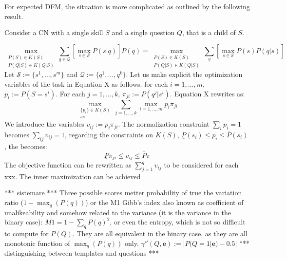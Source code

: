 \documentclass[runningheads]{llncs}
\begin{document}
For expected DFM, the situation is more complicated as outlined by the following result.

\begin{theorem}
Consider a CN with a single skill $S$ and a single question $Q$, that is a child of $S$.

\begin{equation}
\max_{\substack{P(S)\in K(S)\\P(Q|S)\in K(Q|S)}} \sum_{q\in\mathcal{Q}} \left[ \max_{s\in\mathcal{S}} P(s|q) \right] P(q)
=\max_{\substack{P(S)\in K(S)\\P(Q|S)\in K(Q|S)}} \sum_q \left[ \max_{s\in\mathcal{S}} P(s)P(q|s) \right] 
\end{equation}
Let $\mathcal{S}:=\{s^1,\ldots,s^m\}$ and
$\mathcal{Q}:=\{q^1,\ldots,q^k\}$.
Let us make explicit the optimization variables of the task in Equation X as follows. 
for each $i=1,\ldots,m$, $p_i:=P(S=s^i)$.
For each $j=1,\ldots,k$, $\pi_{ji}:=P(q^j|s^i)$. Equation X rewrites as:
\begin{equation}
\max_{\substack{\{p_i\} \in K(S)\\ ss}} \sum_{j=1,\ldots,k} \max_{i=1,\ldots,m} p_i \pi_{ji} 
\end{equation}
We introduce the variables $v_{ij}:=p_i \pi_{ji}$. The normalization constraint $\sum_i p_i=1$ becomes $\sum_{ij} v_{ij}=1$, regarding the constraints on $K(S)$, $\underline{P}(s_i) \leq p_i \leq \overline{P}(s_i)$, the becomes:
$$\underline{P} \pi_{ji} \leq v_{ij} \leq \overline{P} \pi$$
The objective function can be rewritten as $\sum_{j=1}^q v_{ij}$
to be considered for each xxx.
The inner maximization can be achieved 
\end{theorem}

*** sistemare *** Three possible scores metter probability of true the variation ratio ($1-\max_q(P(q))$) or the M1 Gibb's index 	also known as coefficient of unalikeability and somehow related to the variance (it is 	the variance in the binary case): $M1 = 1-\sum_q P(q)^2$, or even the entropy, which is 	not so difficult to compute for $P(Q)$. They are all equivalent in the binary case, as they are all monotonic function of $\max_q(P(q))$ only.
$\gamma''(Q,\bm{e}) :=  |P(Q=1|\bm{e})-0.5|$
*** distinguishing between templates and questions ***
\end{document}
